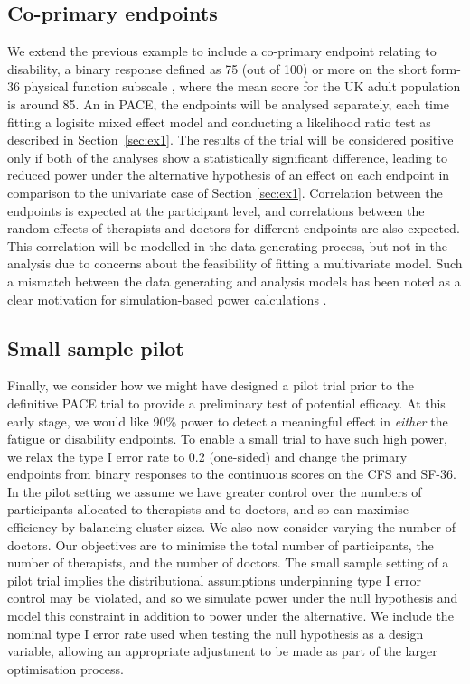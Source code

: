 \documentclass[sagev, doublespace, Crown]{sagej}
\begin{document}
\subsection{Co-primary endpoints}\label{sec:ex2}

We extend the previous example to include a co-primary endpoint relating to disability, a binary response defined as 75 (out of 100) or more on the short form-36 physical function subscale \cite{McHorney1993}, where the mean score for the UK adult population is around 85. An in PACE, the endpoints will be analysed separately, each time fitting a logisitc mixed effect model and conducting a likelihood ratio test as described in Section~\ref{sec:ex1}. The results of the trial will be considered positive only if both of the analyses show a statistically significant difference, leading to reduced power under the alternative hypothesis of an effect on each endpoint in comparison to the univariate case of Section \ref{sec:ex1}\cite{Senn2007}. Correlation between the endpoints is expected at the participant level, and correlations between the random effects of therapists and doctors for different endpoints are also expected. This correlation will be modelled in the data generating process, but not in the analysis due to concerns about the feasibility of fitting a multivariate model. Such a mismatch between the data generating and analysis models has been noted as a clear motivation for simulation-based power calculations \cite{Landau2013}.

\subsection{Small sample pilot}\label{sec:ex3}

Finally, we consider how we might have designed a pilot trial prior to the definitive PACE trial to provide a preliminary test of potential efficacy. At this early stage, we would like 90\% power to detect a meaningful effect in \emph{either} the fatigue or disability endpoints. To enable a small trial to have such high power, we relax the type I error rate to 0.2 (one-sided) and change the primary endpoints from binary responses to the continuous scores on the CFS and SF-36. In the pilot setting we assume we have greater control over the numbers of participants allocated to therapists and to doctors, and so can maximise efficiency by balancing cluster sizes. We also now consider varying the number of doctors.  Our objectives are to minimise the total number of participants, the number of therapists, and the number of doctors. The small sample setting of a pilot trial implies the distributional assumptions underpinning type I error control may be violated, and so we simulate power under the null hypothesis and model this constraint in addition to power under the alternative. We include the nominal type I error rate used when testing the null hypothesis as a design variable, allowing an appropriate adjustment to be made as part of the larger optimisation process.
 
\end{document}
